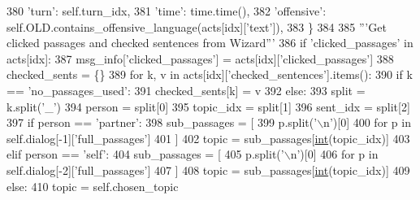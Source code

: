 \begin{DoxyCode}
380                 \textcolor{stringliteral}{'turn'}: self.turn\_idx,
381                 \textcolor{stringliteral}{'time'}: time.time(),
382                 \textcolor{stringliteral}{'offensive'}: self.OLD.contains\_offensive\_language(acts[idx][\textcolor{stringliteral}{'text'}]),
383             \}
384 
385             \textcolor{stringliteral}{'''Get clicked passages and checked sentences from Wizard'''}
386             \textcolor{keywordflow}{if} \textcolor{stringliteral}{'clicked\_passages'} \textcolor{keywordflow}{in} acts[idx]:
387                 msg\_info[\textcolor{stringliteral}{'clicked\_passages'}] = acts[idx][\textcolor{stringliteral}{'clicked\_passages'}]
388                 checked\_sents = \{\}
389                 \textcolor{keywordflow}{for} k, v \textcolor{keywordflow}{in} acts[idx][\textcolor{stringliteral}{'checked\_sentences'}].items():
390                     \textcolor{keywordflow}{if} k == \textcolor{stringliteral}{'no\_passages\_used'}:
391                         checked\_sents[k] = v
392                     \textcolor{keywordflow}{else}:
393                         split = k.split(\textcolor{stringliteral}{'\_'})
394                         person = split[0]
395                         topic\_idx = split[1]
396                         sent\_idx = split[2]
397                         \textcolor{keywordflow}{if} person == \textcolor{stringliteral}{'partner'}:
398                             sub\_passages = [
399                                 p.split(\textcolor{stringliteral}{'\(\backslash\)n'})[0]
400                                 \textcolor{keywordflow}{for} p \textcolor{keywordflow}{in} self.dialog[-1][\textcolor{stringliteral}{'full\_passages'}]
401                             ]
402                             topic = sub\_passages[\hyperlink{namespacelanguage__model_1_1eval__ppl_a7d12ee00479673c5c8d1f6d01faa272a}{int}(topic\_idx)]
403                         \textcolor{keywordflow}{elif} person == \textcolor{stringliteral}{'self'}:
404                             sub\_passages = [
405                                 p.split(\textcolor{stringliteral}{'\(\backslash\)n'})[0]
406                                 \textcolor{keywordflow}{for} p \textcolor{keywordflow}{in} self.dialog[-2][\textcolor{stringliteral}{'full\_passages'}]
407                             ]
408                             topic = sub\_passages[\hyperlink{namespacelanguage__model_1_1eval__ppl_a7d12ee00479673c5c8d1f6d01faa272a}{int}(topic\_idx)]
409                         \textcolor{keywordflow}{else}:
410                             topic = self.chosen\_topic

\end{DoxyCode}
